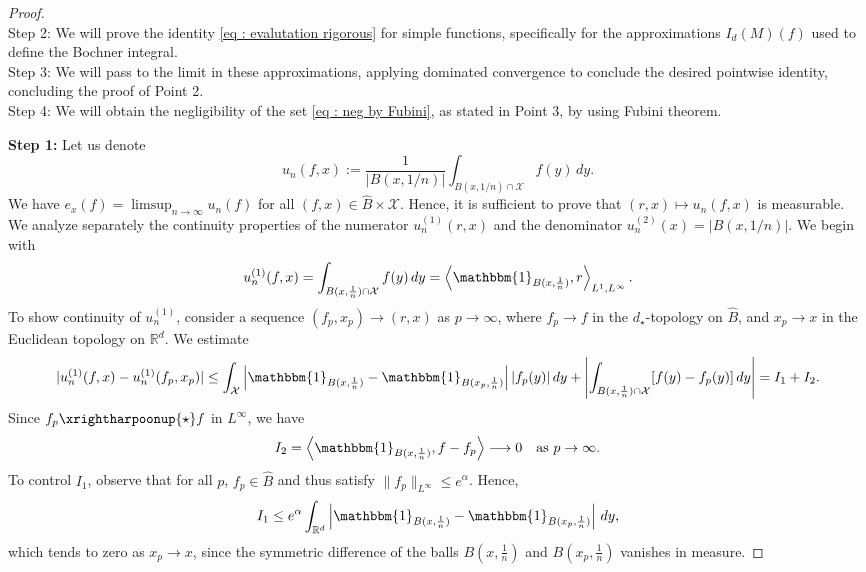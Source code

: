 \documentclass[a4paper, 11pt]{article}
\theoremstyle{definition}
\newcommand{\cX}{{\mathcal{X}}}
\begin{document}
{\begin{proof}
	\\
	{Step 2:} We will prove the identity \eqref{eq : evalutation rigorous} for simple functions, specifically for the approximations \( I_d(M)(f) \) used to define the Bochner integral. 
	\\
	{Step 3:} We will pass to the limit in these approximations, applying dominated convergence to conclude the desired pointwise identity, concluding the proof of Point 2. 
	\\
	{Step 4:} We will obtain the negligibility of the set \eqref{eq : neg by Fubini}, as stated in Point 3, by using Fubini theorem.
	
	\textbf{Step 1:} Let us  denote
		\begin{equation} \label{eq : def approx of evaluation}
		u_n(f,x) := \frac{1}{|B(x,1/n)|} \int_{B(x,1/n)\cap\cX} f(y) \, dy.
		\end{equation}
	We have $e_x(f)=\limsup_{n \to \infty} u_n(f)$ for all $(f,x) \in \widehat{B}\times\cX$.  Hence, it is sufficient to prove that $(r,x) \mapsto u_n(f,x)$ is measurable.	
	We analyze separately the continuity properties of the numerator \( u_n^{(1)}(r,x) \) and the denominator \( u_n^{(2)}(x)= |B(x,1/n)|\). We begin with
	\[
	u_n^{(1)}(f,x) = \int_{B(x, \frac{1}{n})\cap\cX} f(y) \, dy = \left\langle \mathbbm{1}_{B(x, \frac{1}{n})}, r \right\rangle_{L^1, L^\infty}.
	\]
	To show continuity of \( u_n^{(1)} \), consider a sequence \( (f_p, x_p) \to (r,x) \) as \( p \to \infty \), where \( f_p \to f \) in the \( d_\star \)-topology on \( \widehat{B} \), and \( x_p \to x \) in the Euclidean topology on \( \mathbb{R}^d \). We estimate
	\[
	|u_n^{(1)}(f,x) - u_n^{(1)}(f_p,x_p)| 
	\le \int_{\cX} \left| \mathbbm{1}_{B(x, \frac{1}{n})} - \mathbbm{1}_{B(x_p, \frac{1}{n})} \right| |f_p(y)| \, dy + \left| \int_{B(x, \frac{1}{n})\cap\cX} [f(y) - f_p(y)] \, dy \right| 
	= I_1 + I_2.
	\]
	Since \( f_p \xrightharpoonup{\star} f \) in \( L^\infty \), we have
	\[
	I_2 = \left\langle \mathbbm{1}_{B(x, \frac{1}{n})}, f - f_p \right\rangle \longrightarrow 0
	\quad \text{as } p \to \infty.
	\]
	To control \( I_1 \), observe that for all \( p \), \( f_p \in \widehat{B} \) and thus satisfy \( \|f_p\|_{L^\infty} \le e^{\alpha} \). Hence,
	\[
	I_1 \le e^{\alpha} \int_{\mathbb{R}^d} \left| \mathbbm{1}_{B(x, \frac{1}{n})} - \mathbbm{1}_{B(x_p, \frac{1}{n})} \right| \, dy,
	\]
	which tends to zero as \( x_p \to x \), since the symmetric difference of the balls \( B(x, \frac{1}{n}) \) and \( B(x_p, \frac{1}{n}) \) vanishes in measure.
	

\end{proof}}
\end{document}

